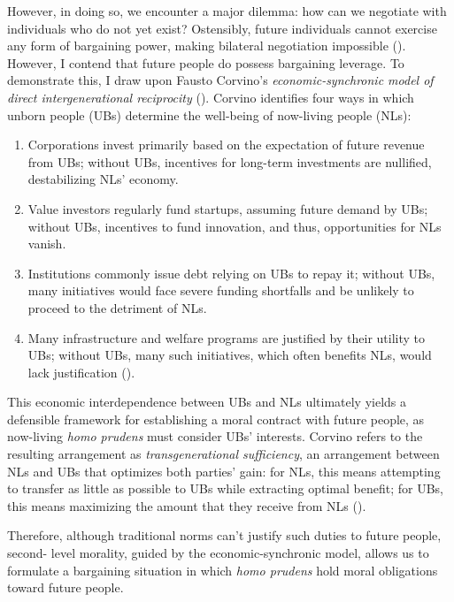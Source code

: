 \documentclass[12pt, a4paper, twoside]{article}
\begin{document}
However, in doing so, we encounter a major dilemma: how can we negotiate with individuals who do not yet exist? Ostensibly, future individuals cannot exercise any form of bargaining power, making bilateral negotiation impossible (\cite[p.\ 17]{kulkarni2024}). However, I contend that future people do possess bargaining leverage. To demonstrate this, I draw upon Fausto Corvino’s \emph{economic-synchronic model of direct intergenerational reciprocity} (\cite[p.\ 398]{corvino2023}). Corvino identifies four ways in which unborn people (UBs) determine the well-being of now-living people (NLs):
\begin{enumerate}

	\item Corporations invest primarily based on the expectation of future revenue from UBs; without UBs, incentives for long-term investments are nullified, destabilizing NLs’ economy.

	\item Value investors regularly fund startups, assuming future demand by UBs; without UBs, incentives to fund innovation, and thus, opportunities for NLs vanish.

	\item Institutions commonly issue debt relying on UBs to repay it; without UBs, many initiatives would face severe funding shortfalls and be unlikely to proceed to the detriment of NLs.

	\item Many infrastructure and welfare programs are justified by their utility to UBs; without UBs, many such initiatives, which often benefits NLs, would lack justification (\cite[pp.\ 400-402]{corvino2023}).

\end{enumerate}

This economic interdependence between UBs and NLs ultimately yields a defensible framework for establishing a moral contract with future people, as now-living \emph{homo prudens} must consider UBs’ interests. Corvino refers to the resulting arrangement as \emph{transgenerational sufficiency}, an arrangement between NLs and UBs that optimizes both parties’ gain: for NLs, this means attempting to transfer as little as possible to UBs while extracting optimal benefit; for UBs, this means maximizing the amount that they receive from NLs (\cite[p.\ 404]{corvino2023}).

Therefore, although traditional norms can’t justify such duties to future people, second- level morality, guided by the economic-synchronic model, allows us to formulate a bargaining situation in which \emph{homo prudens} hold moral obligations toward future people.
\end{document}
